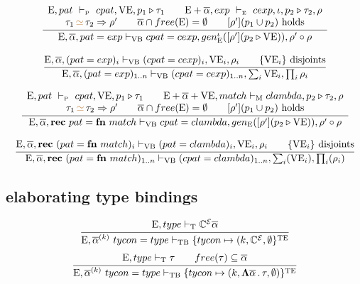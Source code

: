 \documentclass[11pt,a4paper]{article}
\newcommand{\key}[1]{\textrm{\textbf{#1}}}
\newcommand{\nbkey}[1]{\textrm{#1}}
\newcommand{\qualtype}[2]{#1 \triangleright #2}
\newcommand{\unify}[3]{#1\,{\color{brown}{\simeq}}\,#2 \Rightarrow #3}
\newcommand{\braced}[1]{\{#1\}}
\newcommand{\compose}[2]{#1 \circ #2}
\newcommand{\tyfun}[2]{\mathbf{\Lambda}{#1}\,.\,{#2}}
\newcommand{\Type} {\textrm{T}}
\newcommand{\Env}  {\textrm{E}}
\newcommand{\VE}   {\textrm{VE}}
\newcommand{\TE}   {\textrm{TE}}
\newcommand{\VB}   {\textrm{VB}}
\newcommand{\TB}   {\textrm{TB}}
\newcommand{\Match}{\textrm{M}}
\newcommand{\tycon}{\mathbb{C}}
\newcommand{\equality}{\mathcal{E}}
\newcommand{\vdashE}  {\ \vdash_{\textrm{\tiny E}}\  }
\newcommand{\vdashP}  {\ \vdash_{\textrm{\tiny P}}\  }
\begin{document}
\[
\cfrac
 {\begin{array}{c}
   \Env,pat \vdashP cpat, \VE, \qualtype{p_{1}}{\tau_{1}} \qquad
   \Env+\overline{\alpha}, exp \vdashE cexp, \iota, \qualtype{p_{2}}{\tau_{2}}, \rho \\
   \unify{\tau_{1}}{\tau_{2}}{\rho'}  \qquad 
   \overline{\alpha} \cap free(\Env) = \emptyset \qquad [\rho'](p_{1} \cup p_{2})\ \nbkey{holds} \\
  \end{array}}
 {\begin{array}{ll} 
  \Env,\overline{\alpha}, pat = exp \vdash_\VB 
   cpat = cexp, gen_\Env^{\iota}([\rho'](\qualtype{p_{2}}{\VE})), \compose{\rho'}{\rho} \\
  \end{array}}
\]

\[
\cfrac
 {
   \Env,\overline{\alpha}, (pat = exp)_i \vdash_\VB (cpat = cexp)_i, \VE_i, \rho_i \qquad
   \braced{\VE_i}\ \nbkey{disjoints}
  }
 {
  \Env,\overline{\alpha}, (pat = exp)_{1..n} \vdash_\VB
    (cpat = cexp)_{1..n}, \sum_i\VE_i, \prod_i\rho_i
 }
\]

\[
\cfrac
 {\begin{array}{c}
   \Env,pat \vdashP cpat, \VE, \qualtype{p_{1}}{\tau_{1}} \qquad
   \Env+\overline{\alpha}+\VE, match \vdash_\Match clambda, \qualtype{p_2}{\tau_2}, \rho \\
   \unify{\tau_{1}}{\tau_{2}}{\rho'} \qquad 
   \overline{\alpha} \cap free(\Env) = \emptyset \qquad [\rho'](p_{1} \cup p_{2})\ \nbkey{holds} \\
  \end{array}}
 { \Env,\overline{\alpha}, \key{rec}\ pat = \key{fn}\ match \vdash_\VB
   cpat = clambda, gen_\Env([\rho'](\qualtype{p_{2}}{\VE})), \compose{\rho'}{\rho}}
\]

\[
\cfrac
 {
   \Env,\overline{\alpha}, \key{rec}\ (pat = \key{fn}\ match)_i \vdash_\VB (pat = clambda)_i, \VE_i, \rho_i \qquad
   \braced{\VE_i}\ \nbkey{disjoints}
 }
 { \Env,\overline{\alpha}, \key{rec}\ (pat = \key{fn}\ match)_{1..n} \vdash_\VB
   (cpat = clambda)_{1..n}, \sum_i(\VE_i), \prod_i(\rho_i)}
\]

\subsection{elaborating type bindings}
\[
\cfrac
 {\Env, type \vdash_\Type \tycon^\equality \overline\alpha }
 {\Env,\overline{\alpha}^{(k)}\ tycon = type \vdash_\TB \braced{tycon \mapsto (k, \tycon^\equality,\emptyset}^\TE}
\]
\[
\cfrac
 {\Env, type \vdash_\Type \tau \qquad free(\tau) \subseteq \overline\alpha}
 {\Env,\overline{\alpha}^{(k)}\ tycon = type \vdash_\TB 
  \braced{tycon \mapsto (k, \tyfun{\overline\alpha}{\tau},\emptyset)}^\TE}
\]
\end{document}
